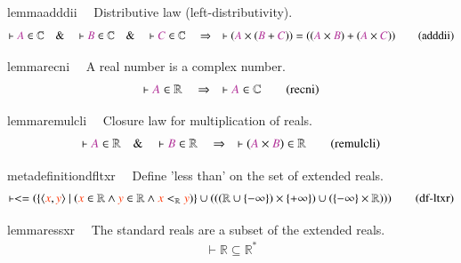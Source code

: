 \begin{restatable}{lemma}{adddii}~~ Distributive law (left-distributivity). 
~
\begin{align}
\vdash \mc{A} \in \mathbb{C}\quad\&\quad \vdash \mc{B} \in
    \mathbb{C}\quad\&\quad \vdash \mc{C} \in \mathbb{C}\quad\Rightarrow\quad
    \vdash ( \mc{A} \times ( \mc{B} + \mc{C} ) ) = ( ( \mc{A} \times \mc{B} ) + (
    \mc{A} \times \mc{C} ) )\label{eq:adddii}\tag{adddii}
\end{align}
\end{restatable}

\begin{restatable}{lemma}{recni}~~ A real number is a complex number. 
~
\begin{align}
\vdash \mc{A} \in \mathbb{R}\quad\Rightarrow\quad \vdash \mc{A} \in
    \mathbb{C}\label{eq:recni}\tag{recni}
\end{align}
\end{restatable}

\begin{restatable}{lemma}{remulcli}~~ Closure law for multiplication of reals. 
~
\begin{align}
\vdash \mc{A} \in \mathbb{R}\quad\&\quad \vdash \mc{B} \in
    \mathbb{R}\quad\Rightarrow\quad \vdash ( \mc{A} \times \mc{B} ) \in
    \mathbb{R}\label{eq:remulcli}\tag{remulcli}
\end{align}
\end{restatable}

\begin{restatable}{metadefinition}{dfltxr}~~ Define 'less than' on the set of
extended reals.        ~
\begin{align}
\vdash < = ( \{ \langle \msc{x} , \msc{y} \rangle~\vert~( \msc{x} \in \mathbb{R}
    \wedge \msc{y} \in \mathbb{R} \wedge \msc{x} <_\mathbb{R} \msc{y} ) \} \cup
    ( ( ( \mathbb{R} \cup \{ -\infty \} ) \times \{ +\infty \} ) \cup ( \{
    -\infty \} \times \mathbb{R} ) ) )\label{eq:df-ltxr}\tag{df-ltxr}
\end{align}
\end{restatable}

\begin{restatable}{lemma}{ressxr}~~ The standard reals are a subset of the
extended reals.  ~
\begin{align}
\vdash \mathbb{R} \subseteq \mathbb{R}^{\ast}\label{eq:ressxr}\tag{ressxr}
\end{align}
\end{restatable}

